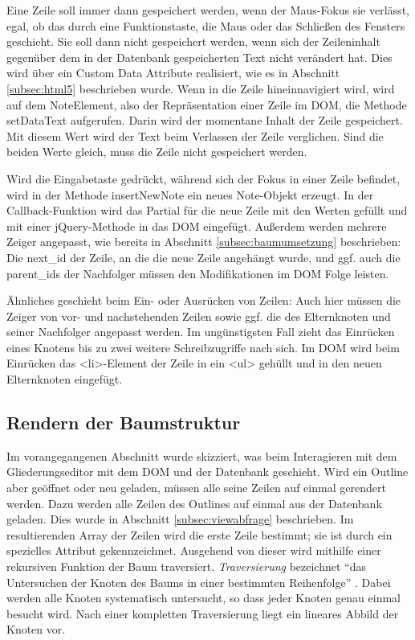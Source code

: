 Eine Zeile soll immer dann gespeichert werden, wenn der Maus-Fokus sie verlässt, egal, ob das durch eine Funktionstaste, die Maus oder das Schließen des Fensters geschieht. Sie soll dann nicht gespeichert werden, wenn sich der Zeileninhalt gegenüber dem in der Datenbank gespeicherten Text nicht verändert hat. Dies wird über ein Custom Data Attribute realisiert, wie es in Abschnitt \ref{subsec:html5} beschrieben wurde. Wenn in die Zeile hineinnavigiert wird, wird auf dem {\selectfont NoteElement}, also der Repräsentation einer Zeile im DOM, die Methode {\selectfont setDataText} aufgerufen. Darin wird der momentane Inhalt der Zeile gespeichert. Mit diesem Wert wird der Text beim Verlassen der Zeile verglichen. Sind die beiden Werte gleich, muss die Zeile nicht gespeichert werden. 

Wird die Eingabetaste gedrückt, während sich der Fokus in einer Zeile befindet, wird in der Methode {\selectfont insertNewNote} ein neues Note-Objekt erzeugt. In der Callback-Funktion wird das Partial für die neue Zeile mit den Werten gefüllt und mit einer jQuery-Methode in das DOM eingefügt. Außerdem werden mehrere Zeiger angepasst, wie bereits in Abschnitt \ref{subsec:baumumsetzung} beschrieben: Die {\selectfont next\_id} der Zeile, an die die neue Zeile angehängt wurde, und ggf. auch die {\selectfont parent\_id}s der Nachfolger müssen den Modifikationen im DOM Folge leisten.

Ähnliches geschieht beim Ein- oder Ausrücken von Zeilen: Auch hier müssen die Zeiger von vor- und nachstehenden Zeilen sowie ggf. die des Elternknoten und seiner Nachfolger angepasst werden. Im ungünstigsten Fall zieht das Einrücken eines Knotens bis zu zwei weitere Schreibzugriffe nach sich. Im DOM wird beim Einrücken das {\selectfont <li>}-Element der Zeile in ein {\selectfont <ul>} gehüllt und in den neuen Elternknoten eingefügt.



\subsection{Rendern der Baumstruktur}
\label{subsec:baum-rendern}


Im vorangegangenen Abschnitt wurde skizziert, was beim Interagieren mit dem Gliederungseditor mit dem DOM und der Datenbank geschieht. Wird ein Outline aber geöffnet oder neu geladen, müssen alle seine Zeilen auf einmal gerendert werden. Dazu werden alle Zeilen des Outlines auf einmal aus der Datenbank geladen. Dies wurde in Abschnitt \ref{subsec:viewabfrage} beschrieben. Im resultierenden Array der Zeilen wird die erste Zeile bestimmt; sie ist durch ein spezielles Attribut gekennzeichnet. Ausgehend von dieser wird mithilfe einer rekursiven Funktion der Baum traversiert. \textit{Traversierung} bezeichnet \enquote{das Untersuchen der Knoten des Baums in einer bestimmten Reihenfolge} . Dabei werden alle Knoten systematisch untersucht, so dass jeder Knoten genau einmal besucht wird. Nach einer kompletten Traversierung liegt ein lineares Abbild der Knoten vor. 

